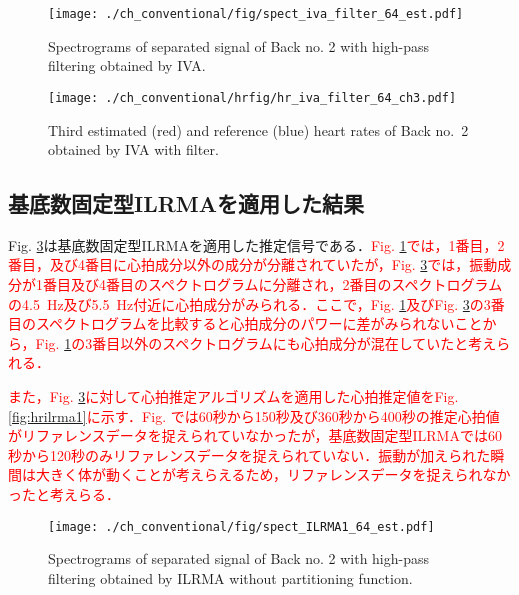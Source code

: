 \begin{figure}[tb]
\centering
\texttt{[image: ./ch\_conventional/fig/spect\_iva\_filter\_64\_est.pdf]}
\caption{Spectrograms of separated signal of Back no. 2 with high-pass filtering obtained by IVA.}
\label{fig:sfiva64est}
\end{figure}

\begin{figure}[tb]
\centering
\texttt{[image: ./ch\_conventional/hrfig/hr\_iva\_filter\_64\_ch3.pdf]}
  \caption{Third estimated (red) and reference (blue) heart rates of Back no.~2 obtained by IVA with filter.}
  \label{fig:fhriva64ch3}
\end{figure}


\subsection{基底数固定型ILRMAを適用した結果}
\label{sec:conv:resultilrma1}
Fig. \ref{fig:silrma1}は基底数固定型ILRMAを適用した推定信号である．\textcolor{red}{Fig. \ref{fig:sfiva64est}では，1番目，2番目，及び4番目に心拍成分以外の成分が分離されていたが，Fig. \ref{fig:silrma1}では，振動成分が1番目及び4番目のスペクトログラムに分離され，2番目のスペクトログラムの4.5~Hz及び5.5~Hz付近に心拍成分がみられる．ここで，Fig. \ref{fig:sfiva64est}及びFig. \ref{fig:silrma1}の3番目のスペクトログラムを比較すると心拍成分のパワーに差がみられないことから，Fig. \ref{fig:sfiva64est}の3番目以外のスペクトログラムにも心拍成分が混在していたと考えられる．}

\textcolor{red}{また，Fig. \ref{fig:silrma1}に対して心拍推定アルゴリズムを適用した心拍推定値をFig. \ref{fig:hrilrma1}に示す．Fig. \label{fig:fhriva64ch3}では60秒から150秒及び360秒から400秒の推定心拍値がリファレンスデータを捉えられていなかったが，基底数固定型ILRMAでは60秒から120秒のみリファレンスデータを捉えられていない．振動が加えられた瞬間は大きく体が動くことが考えらえるため，リファレンスデータを捉えられなかったと考えらる．}

\begin{figure}[tb]
\centering
\texttt{[image: ./ch\_conventional/fig/spect\_ILRMA1\_64\_est.pdf]}
\caption{Spectrograms of separated signal of Back no. 2 with high-pass filtering obtained by ILRMA without partitioning function.}
\label{fig:silrma1}
\end{figure}

